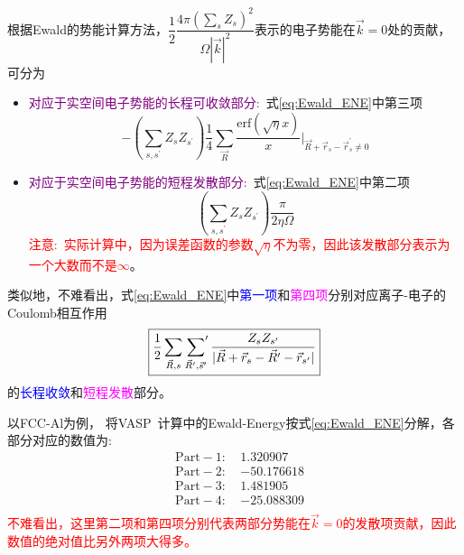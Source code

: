 \documentclass{article}      %
\begin{document}
根据\textrm{Ewald}的势能计算方法，$\boxed{\dfrac12\dfrac{4\pi(\sum_sZ_s)^2}{\Omega|\vec k|^2}}$表示的电子势能在$\vec k=0$处的贡献，可分为
	\begin{itemize}
		\item \textcolor{purple}{对应于实空间电子势能的长程可收敛部分:~}式\eqref{eq:Ewald_ENE}中第三项
			\begin{displaymath}
				-(\sum\limits_{s,s^{\prime}}Z_sZ_{s^{\prime}})\dfrac14\sum_{\vec R}\dfrac{\mathrm{erf}(\sqrt{\eta}x)}x\bigg|_{\vec R+\vec r_s-\vec r_s^{\prime}\neq0}
			\end{displaymath}
		\item \textcolor{purple}{对应于实空间电子势能的短程发散部分:~}式\eqref{eq:Ewald_ENE}中第二项
			\begin{displaymath}
				(\sum_{s,s^{\prime}}Z_sZ_{s^{\prime}})\dfrac{\pi}{2\eta\Omega}
			\end{displaymath}
		\textcolor{red}{注意:~实际计算中，因为误差函数的参数$\sqrt{\eta}$不为零，因此该发散部分表示为一个大数而不是$\infty$}。
	\end{itemize}
	类似地，不难看出，式\eqref{eq:Ewald_ENE}中\textcolor{blue}{第一项}和\textcolor{magenta}{第四项}分别对应离子-电子的\textrm{Coulomb}相互作用
	\begin{displaymath}
		\boxed{\dfrac12\sum_{\vec R,s}\sideset{}{^{\prime}}\sum_{\vec R^{\prime},\vec s^{\prime}}\dfrac{Z_sZ_{s^{\prime}}}{|\vec R+\vec r_s-\vec R^{\prime}-\vec r_{s^{\prime}}|}}
	\end{displaymath}
	的\textcolor{blue}{长程收敛}和\textcolor{magenta}{短程发散}部分。

以\textrm{FCC-Al}为例，%
将\textrm{VASP~}计算中的\textrm{Ewald-Energy}按式\eqref{eq:Ewald_ENE}分解，各部分对应的数值为:~
\begin{displaymath}
	\begin{aligned}
	&\mathrm{Part-1}:~&1.320907 \\
	&\mathrm{Part-2}:~&-50.176618 \\ 
	&\mathrm{Part-3}:~&1.481905 \\
	&\mathrm{Part-4}:~&-25.088309 \\
	\end{aligned}
\end{displaymath}
\textcolor{red}{不难看出，这里第二项和第四项分别代表两部分势能在$\vec k=0$的发散项贡献，因此数值的绝对值比另外两项大得多。}
\end{document}

